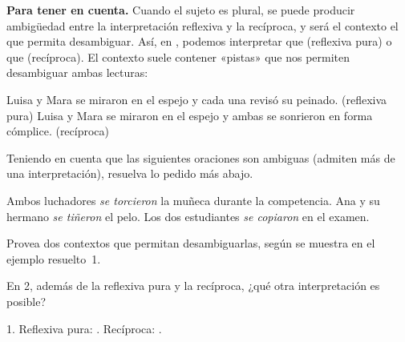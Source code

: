 \begin{destacado}
\textbf{Para tener en cuenta.} Cuando el sujeto es plural, se puede producir
ambigüedad entre la interpretación reflexiva y la recíproca, y será el contexto
el que permita desambiguar. Así, en , podemos interpretar que  (reflexiva pura) o que  (recíproca). El contexto suele
contener «pistas» que nos permiten desambiguar ambas lecturas:

\begin{exe}
  \ex
    \begin{xlist}
      \ex Luisa y Mara se miraron en el espejo y cada una revisó su peinado.
          (reflexiva pura)
      \ex Luisa y Mara se miraron en el espejo y ambas se sonrieron en forma
          cómplice. (recíproca)
    \end{xlist}
\end{exe}
\end{destacado}

\begin{ejercicio}\label{ej:10-ambiguas}
Teniendo en cuenta que las siguientes oraciones son ambiguas (admiten más de una
interpretación), resuelva lo pedido más abajo.

\begin{exe}
  \ex Ambos luchadores \textit{se torcieron} la muñeca durante la competencia.
  \ex Ana y su hermano \textit{se tiñeron} el pelo.
  \ex Los dos estudiantes \textit{se copiaron} en el examen.
\end{exe}

\begin{consignas}
  \item Provea dos contextos que permitan desambiguarlas, según se muestra en el
        ejemplo resuelto~1.
  \item En 2, además de la reflexiva pura y la recíproca, ¿qué otra
        interpretación es posible?
\end{consignas}

\begin{resuelto}
1. Reflexiva pura: . Recíproca: .
\end{resuelto}
\end{ejercicio}

